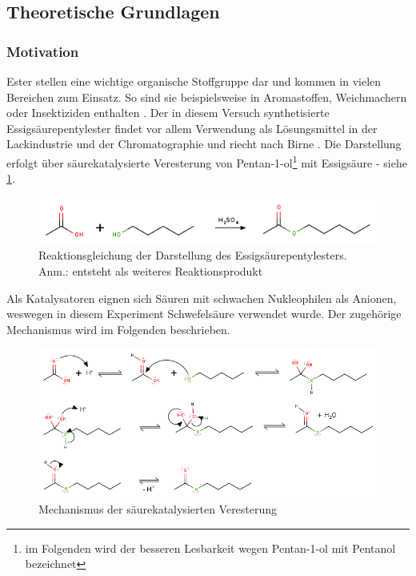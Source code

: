 \documentclass{article}
\begin{document}
    \subsection{Theoretische Grundlagen}
  
      \subsubsection{Motivation} \label{sec:Motivation}
  
        Ester stellen eine wichtige organische Stoffgruppe dar und kommen in vielen Bereichen zum Einsatz. So sind sie beispielsweise in Aromastoffen, Weichmachern oder Insektiziden enthalten \cite{EsterEigenschaften}. Der in diesem Versuch synthetisierte Essigsäurepentylester findet vor allem Verwendung als Lösungsmittel in der Lackindustrie und der Chromatographie und riecht nach Birne \cite{Essigsaurepentyl}. Die Darstellung erfolgt über säurekatalysierte Veresterung von Pentan-1-ol\footnote{im Folgenden wird der besseren Lesbarkeit wegen Pentan-1-ol mit Pentanol bezeichnet} mit Essigsäure - siehe \ref{fig:EssigsaureReaktion}. 
        
        \begin{figure}[h]
          \includegraphics[scale=0.55, center]{Graphiken/Reaktionen/ReactionEsters.png} 
          \caption[Reaktionsgleichung der Darstellung des Essigsäurepentylesters, Quelle: Autor]{Reaktionsgleichung der Darstellung des Essigsäurepentylesters. Anm.:  entsteht als weiteres Reaktionsprodukt}
          \label{fig:EssigsaureReaktion}
        \end{figure}
        
        Als Katalysatoren eignen sich Säuren mit schwachen Nukleophilen als Anionen, weswegen in diesem Experiment Schwefelsäure verwendet wurde. Der zugehörige Mechanismus wird im Folgenden beschrieben.
        
        \begin{figure}[h]
          \includegraphics[scale=0.55, center]{Graphiken/Reaktionen/MechanismVeresterung.png} 
          \caption[Reaktionsgleichung Mechanismus der Veresterung, Quelle: Autor]{Mechanismus der säurekatalysierten Veresterung \cite[S. 208]{Clayden}}
          \label{fig:Mechanismus}
        \end{figure}
        
\end{document}
